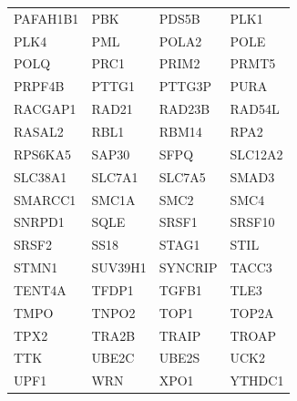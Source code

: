 \begin{longtable}{llll}
PAFAH1B1 & PBK & PDS5B & PLK1 \\
PLK4 & PML & POLA2 & POLE \\
POLQ & PRC1 & PRIM2 & PRMT5 \\
PRPF4B & PTTG1 & PTTG3P & PURA \\
RACGAP1 & RAD21 & RAD23B & RAD54L \\
RASAL2 & RBL1 & RBM14 & RPA2 \\
RPS6KA5 & SAP30 & SFPQ & SLC12A2 \\
SLC38A1 & SLC7A1 & SLC7A5 & SMAD3 \\
SMARCC1 & SMC1A & SMC2 & SMC4 \\
SNRPD1 & SQLE & SRSF1 & SRSF10 \\
SRSF2 & SS18 & STAG1 & STIL \\
STMN1 & SUV39H1 & SYNCRIP & TACC3 \\
TENT4A & TFDP1 & TGFB1 & TLE3 \\
TMPO & TNPO2 & TOP1 & TOP2A \\
TPX2 & TRA2B & TRAIP & TROAP \\
TTK & UBE2C & UBE2S & UCK2 \\
UPF1 & WRN & XPO1 & YTHDC1 \\
\end{longtable}
